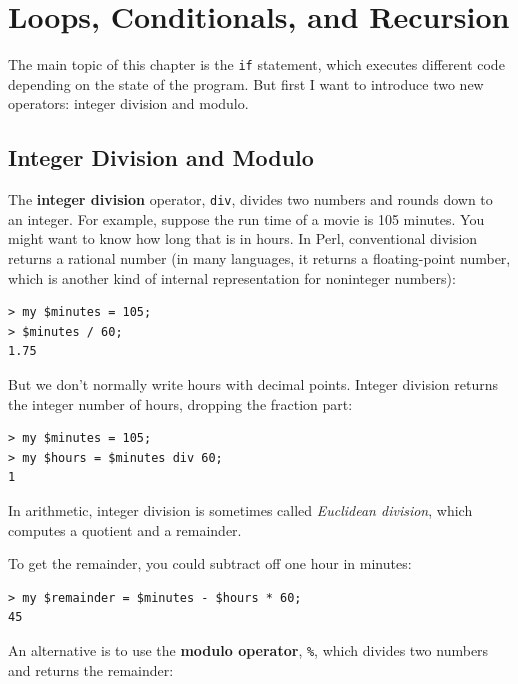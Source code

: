 \chapter{Loops, Conditionals, and Recursion}
\label{conditionals}

The main topic of this chapter is the {\tt if} statement, which
executes different code depending on the state of the program.
But first I want to introduce two new operators: integer 
division and modulo.


\section{Integer Division and Modulo}

The {\bf integer division} operator, \verb"div", divides
two numbers and rounds down to an integer.  For example, 
suppose the
run time of a movie is 105 minutes.  You might want to know how
long that is in hours.  In Perl, conventional division
returns a rational number (in many languages, it returns a 
floating-point number, which is another kind of internal 
representation for noninteger numbers):

\begin{verbatim}
> my $minutes = 105;
> $minutes / 60;
1.75
\end{verbatim}

But we don't normally write hours with decimal points.  Integer 
division returns the integer number of hours, dropping the
fraction part:

\begin{verbatim}
> my $minutes = 105;
> my $hours = $minutes div 60;
1
\end{verbatim}

In arithmetic, integer division is sometimes called 
\emph{Euclidean division}, which computes a quotient and a 
remainder.

To get the remainder, you could subtract off one hour in minutes:

\begin{verbatim}
> my $remainder = $minutes - $hours * 60;
45
\end{verbatim}



An alternative is to use the {\bf modulo operator}, \verb"%", which
divides two numbers and returns the remainder:

